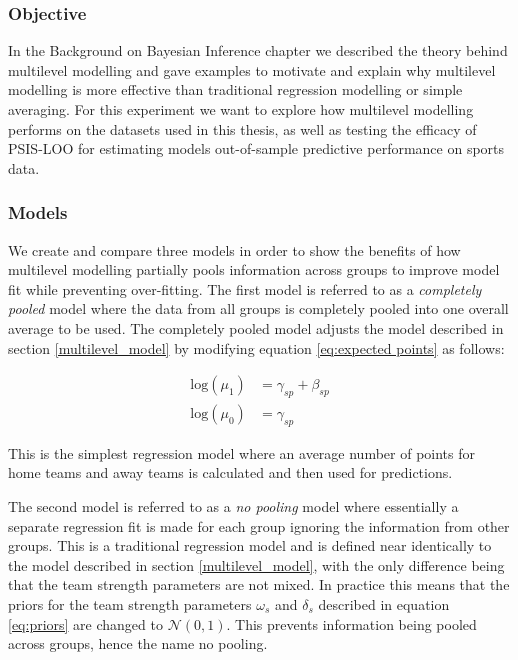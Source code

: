 \subsubsection*{Objective}

In the Background on Bayesian Inference chapter we described the theory behind multilevel modelling and gave examples to motivate and explain why multilevel modelling is more effective than traditional regression modelling or simple averaging. For this experiment we want to explore how multilevel modelling performs on the datasets used in this thesis, as well as testing the efficacy of PSIS-LOO for estimating models out-of-sample predictive performance on sports data.

\subsubsection*{Models}

We create and compare three models in order to show the benefits of how multilevel modelling partially pools information across groups to improve model fit while preventing over-fitting. The first model is referred to as a \textit{completely pooled} model where the data from all groups is completely pooled into one overall average to be used. The completely pooled model adjusts the model described in section \ref{multilevel_model} by modifying equation \ref{eq:expected points} as follows:

\begin{equation} \label{eq:cp_model}
\begin{split}
\text{log}(\mu_{1}) &= \gamma_{sp} + \beta_{sp} \\
\text{log}(\mu_{0}) &= \gamma_{sp}
\end{split}
\end{equation}

This is the simplest regression model where an average number of points for home teams and away teams is calculated and then used for predictions.

The second model is referred to as a \textit{no pooling} model where essentially a separate regression fit is made for each group ignoring the information from other groups. This is a traditional regression model and is defined near identically to the model described in section \ref{multilevel_model}, with the only difference being that the team strength parameters are not mixed. In practice this means that the priors for the team strength parameters $\omega_s$ and $\delta_s$ described in equation \ref{eq:priors} are changed to $\mathcal{N}(0, 1)$. This prevents information being pooled across groups, hence the name no pooling.

